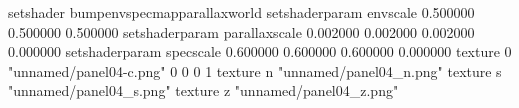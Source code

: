 setshader bumpenvspecmapparallaxworld
setshaderparam envscale 0.500000 0.500000 0.500000
setshaderparam parallaxscale 0.002000 0.002000 0.002000 0.000000
setshaderparam specscale 0.600000 0.600000 0.600000 0.000000
texture 0 "unnamed/panel04-c.png" 0 0 0 1
texture n "unnamed/panel04_n.png"
texture s "unnamed/panel04_s.png"
texture z "unnamed/panel04_z.png"